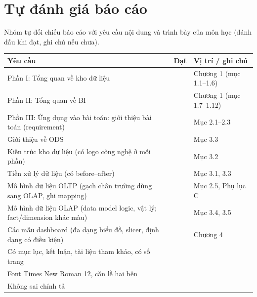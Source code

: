 \chapter*{Tự đánh giá báo cáo}
Nhóm tự đối chiếu báo cáo với yêu cầu nội dung và trình bày của môn học (đánh dấu \checkmark{} khi đạt, ghi chú nếu chưa).

\begin{center}\small\renewcommand{\arraystretch}{1.3}
\begin{tabularx}{\textwidth}{|>{\raggedright\arraybackslash}X|c|>{\raggedright\arraybackslash}p{4cm}|}
\hline
\textbf{Yêu cầu} & \textbf{Đạt} & \textbf{Vị trí / ghi chú}\\ \hline
Phần I: Tổng quan về kho dữ liệu & & Chương 1 (mục 1.1--1.6)\\ \hline
Phần II: Tổng quan về BI & & Chương 1 (mục 1.7--1.12)\\ \hline
Phần III: Ứng dụng vào bài toán: giới thiệu bài toán (requirement) & & Mục 2.1--2.3\\ \hline
Giới thiệu về ODS & & Mục 3.3\\ \hline
Kiến trúc kho dữ liệu (có logo công nghệ ở mỗi phần) & & Mục 3.2\\ \hline
Tiền xử lý dữ liệu (có before--after) & & Mục 3.1, 3.3\\ \hline
Mô hình dữ liệu OLTP (gạch chân trường dùng sang OLAP, ghi mapping) & & Mục 2.5, Phụ lục C\\ \hline
Mô hình dữ liệu OLAP (data model logic, vật lý; fact/dimension khác màu) & & Mục 3.4, 3.5\\ \hline
Các mẫu dashboard (đa dạng biểu đồ, slicer, định dạng có điều kiện) & & Chương 4\\ \hline
Có mục lục, kết luận, tài liệu tham khảo, có số trang & & \\ \hline
Font Times New Roman 12, căn lề hai bên & & \\ \hline
Không sai chính tả & & \\ \hline
\end{tabularx}
\end{center}
